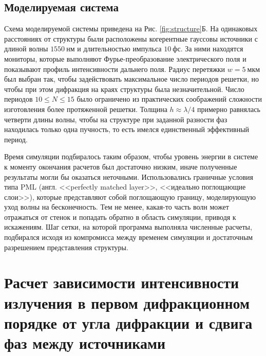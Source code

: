 \subsection{Моделируемая система}
Схема моделируемой системы приведена на Рис. \ref{fig:structure}Б. На одинаковых расстояниях от структуры были расположены когерентные гауссовы источники с длиной волны $1550\ \text{нм}$ и длительностью импульса $10\ \text{фс}$. За ними находятся мониторы, которые выполняют Фурье-преобразование электрического поля и показывают профиль интенсивности дальнего поля. Радиус перетяжки $w = 5\ \text{мкм}$ был выбран так, чтобы задействовать максимальное число периодов решетки, но чтобы при этом дифракция на краях структуры была незначительной. Число периодов $10 \leqslant N \leqslant 15$ было ограничено из практических соображений сложности изготовления более протяженной решетки. Толщина $h \approx \lambda/4$ примерно равнялась четверти длины волны, чтобы на структуре при заданной разности фаз находилась только одна пучность, то есть имелся единственный эффективный период.

Время симуляции подбиралось таким образом, чтобы уровень энергии в системе к моменту окончания расчетов был достаточно низким, иначе полученные результаты могли бы оказаться неточными. Использовались граничные условия типа PML (англ. <<perfectly matched layer>>, <<идеально поглощающие слои>>), которые представляют собой поглощающую границу, моделирующую уход волны на бесконечность. Тем не менее, какая-то часть волн может отражаться от стенок и попадать обратно в область симуляции, приводя к искажениям. Шаг сетки, на которой программа выполняла численные расчеты, подбирался исходя из компромисса между временем симуляции и достаточным разрешением представления структуры.

\section{Расчет зависимости интенсивности излучения в первом дифракционном порядке от угла дифракции и сдвига фаз между источниками}

